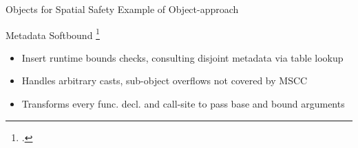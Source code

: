 \documentclass[aspectratio=169]{beamer}
\begin{document}
\begin{frame}{Objects for Spatial Safety}
    \todo Example of Object-approach
\end{frame}




\begin{frame}{Metadata}
Softbound \footcite{nagarakatte_softbound:_2009}
    \begin{itemize}
        \item Insert runtime bounds checks, consulting disjoint metadata via table lookup
        \item Handles arbitrary casts, sub-object overflows not covered by MSCC %
        \item Transforms every func. decl. and call-site to pass base and bound arguments %
    \end{itemize}
\end{frame}
\end{document}
